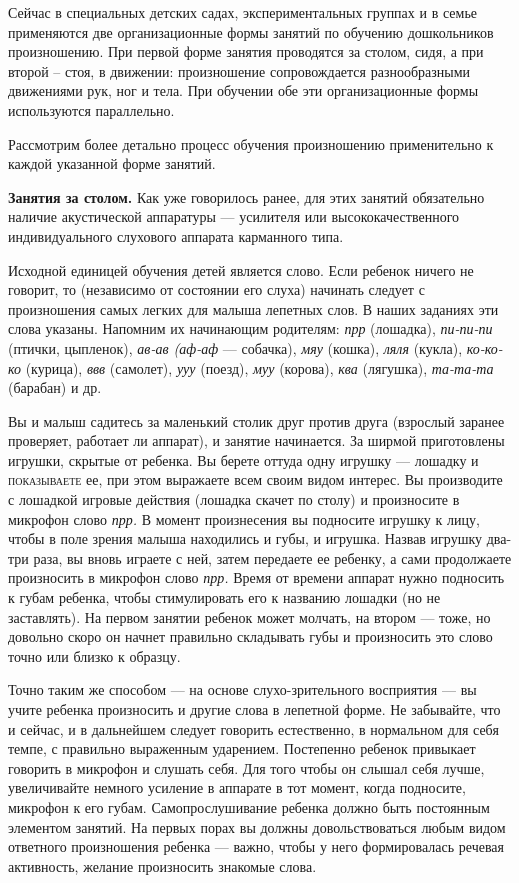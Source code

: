 \documentclass[a5paper]{book}
\renewcommand{\emph}[1]{\textit{#1}}
\begin{document}
Сейчас в специальных детских садах, экспериментальных группах и в семье
применяются две организационные формы занятий по обучению дошкольников
произношению. При первой форме занятия проводятся за столом, сидя, а при
второй -- стоя, в движении: произношение сопровождается разнообразными
движениями рук, ног и тела. При обучении обе эти организационные формы
используются параллельно.

Рассмотрим более детально процесс обучения произношению применительно к
каждой указанной форме занятий.

\textbf{Занятия за столом.} Как уже говорилось ранее, для этих занятий
обязательно наличие акустической аппаратуры --- усилителя или
высококачественного индивидуального слухового аппарата карманного типа.

Исходной единицей обучения детей является слово. Если ребенок ничего не
говорит, то (независимо от состоянии его слуха) начинать следует с
произношения самых легких для малыша лепетных слов. В наших заданиях эти
слова указаны. Напомним их начинающим родителям: \emph{прр} (лошадка),
\emph{пи-пи-пи} (птички, цыпленок), \emph{ав-ав (аф-аф} --- собачка),
\emph{мяу} (кошка), \emph{ляля} (кукла), \emph{ко-ко-ко} (курица),
\emph{ввв} (самолет), \emph{ууу} (поезд), \emph{муу} (корова),
\emph{ква} (лягушка), \emph{та-та-та} (барабан) и др.

Вы и малыш садитесь за маленький столик друг против друга (взрослый
заранее проверяет, работает ли аппарат), и занятие начинается. За ширмой
приготовлены игрушки, скрытые от ребенка. Вы берете оттуда одну игрушку
--- лошадку и \textsc{показываете} ее, при этом выражаете всем своим
видом интерес. Вы производите с лошадкой игровые действия (лошадка
скачет по столу) и произносите в микрофон слово \emph{прр.} В момент
произнесения вы подносите игрушку к лицу, чтобы в поле зрения малыша
находились и губы, и игрушка. Назвав игрушку два-три раза, вы вновь
играете с ней, затем передаете ее ребенку, а сами продолжаете
произносить в микрофон слово \emph{прр.} Время от времени аппарат нужно
подносить к губам ребенка, чтобы стимулировать его к названию лошадки
(но не заставлять). На первом занятии ребенок может молчать, на втором
--- тоже, но довольно скоро он начнет правильно складывать губы и
произносить это слово точно или близко к образцу.

Точно таким же способом --- на основе слухо-зрительного восприятия ---
вы учите ребенка произносить и другие слова в лепетной форме. Не
забывайте, что и сейчас, и в дальнейшем следует говорить естественно, в
нормальном для себя темпе, с правильно выраженным ударением. Постепенно
ребенок привыкает говорить в микрофон и слушать себя. Для того чтобы он
слышал себя лучше, увеличивайте немного усиление в аппарате в тот
момент, когда подносите, микрофон к его губам. Самопрослушивание ребенка
должно быть постоянным элементом занятий. На первых порах вы должны
довольствоваться любым видом ответного произношения ребенка --- важно,
чтобы у него формировалась речевая активность, желание произносить
знакомые слова.
\end{document}

